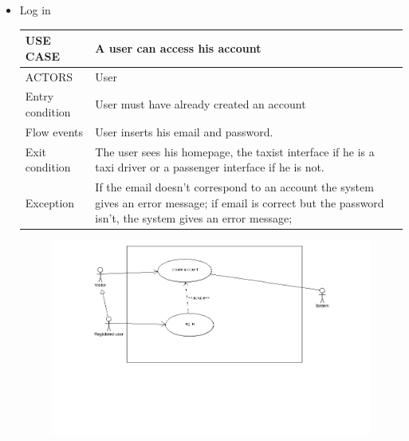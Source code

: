 \begin{itemize}
\item Log in
	\begin{center}
   	 \begin{tabular}{ | l | p{11cm} |}
   	 \hline
   	USE CASE & A user can access his account\\ \hline
   	 ACTORS & User\\ \hline
    	 Entry condition & User must have already created an account \\ \hline
    	 Flow events & User inserts his email and password.\\ \hline
  	   Exit condition & The user sees his homepage, the taxist interface if he is a taxi driver or a passenger interface if he is not.\\ \hline
  	   Exception &  If the email doesn't correspond to an account the system gives an error message;
            if email is correct but the password isn't, the system gives an error message;\\ \hline
    \end{tabular}
\end{center}
\begin{center}
	\begin{figure} [h]
  	  \includegraphics[scale=0.5]{register.png}
	\end{figure}
	\end{center}
	\newpage 


\end{itemize}
